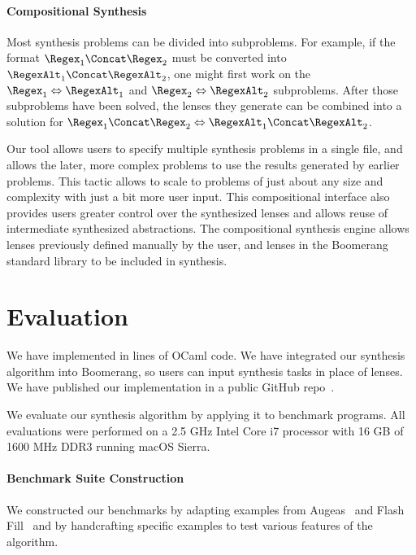 \documentclass[acmsmall,screen]{acmart}
\begin{document}
\paragraph*{Compositional Synthesis}
Most synthesis problems can be divided into subproblems.  For example, if the
format $\Regex_1 \Concat \Regex_2$ must be converted into $\RegexAlt_1 \Concat
\RegexAlt_2$, one might first work on the $\Regex_1 \Leftrightarrow \RegexAlt_1$ and
$\Regex_2 \Leftrightarrow \RegexAlt_2$ subproblems.  After those subproblems have
been solved, the lenses they generate can be combined into a solution for
$\Regex_1 \Concat \Regex_2 \Leftrightarrow \RegexAlt_1 \Concat \RegexAlt_2$.

Our tool allows users to specify multiple synthesis problems in a single file,
and allows the later, more complex problems to use the results generated by
earlier problems.  This tactic allows \Optician{} to scale to problems of just
about any size and complexity with just a bit more user input.  This
compositional interface also provides users greater control over the
synthesized lenses and allows reuse of intermediate synthesized abstractions.
The compositional synthesis engine allows
lenses previously defined manually by the user, and lenses in the Boomerang standard
library to be included in synthesis.



\section{Evaluation}
\label{evaluation}

We have implemented \Optician{} in \LOC{} lines
of OCaml code.  We have integrated our synthesis algorithm into Boomerang, so
users can input synthesis tasks in place of lenses.  We have published our
implementation in a public GitHub repo~\cite{GitHub}.

We evaluate our synthesis algorithm by applying it to \BenchmarkCount{}
benchmark programs.
All evaluations were performed on a 2.5 GHz Intel Core i7 processor with 16 GB
of 1600 MHz DDR3 running macOS Sierra.

\paragraph*{Benchmark Suite Construction}
We constructed our benchmarks by adapting examples from
Augeas~\cite{augeas} and 
Flash Fill~\cite{gulwani-popl-2014} and by handcrafting specific
examples to test various features of the algorithm.
\end{document}
